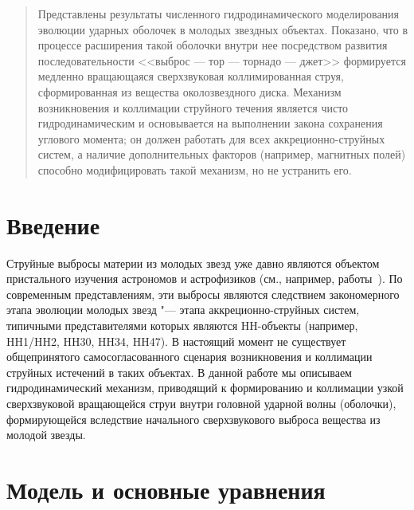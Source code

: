 \begin{abstract}
Представлены результаты численного гидродинамического моделирования
эволюции ударных оболочек в молодых звездных объектах.
Показано, что в процессе расширения такой оболочки внутри нее
посредством развития последовательности <<выброс --- тор --- торнадо --- джет>>
формируется медленно вращающаяся сверхзвуковая коллимированная струя,
сформированная из вещества околозвездного диска. Механизм возникновения
и коллимации струйного течения является чисто
гидродинамическим и основывается на выполнении закона сохранения
углового момента; он должен работать для всех аккреционно-струйных
систем, а наличие дополнительных факторов (например, магнитных полей)
способно модифицировать такой механизм, но не устранить его.
\end{abstract}


\section*{Введение}
\label{sect:kmx:intro}


Струйные выбросы материи из молодых звезд уже давно являются объектом
пристального изучения астрономов и астрофизиков (см., например,
работы~\cite{kmx:mundt-1986, kmx:mundt-etal-1987, kmx:mundt-1987, kmx:raga-etal-1991, kmx:mundt-etal-1991, kmx:little-1994}).
По современным представлениям, эти выбросы являются следствием
закономерного этапа эволюции молодых звезд "--- этапа аккреционно-струйных
систем, типичными представителями которых являются HH-объекты
(например, HH1/HH2, HH30, HH34, HH47). В настоящий момент не
существует общепринятого самосогласованного сценария возникновения
и коллимации струйных истечений в таких объектах. В данной работе
мы описываем гидродинамический механизм, приводящий
к формированию и коллимации узкой сверхзвуковой вращающейся струи
внутри головной ударной волны (оболочки), формирующейся
вследствие начального сверхзвукового выброса вещества из молодой
звезды.


\section{Модель и основные уравнения}
\label{sect:kmx:model}


